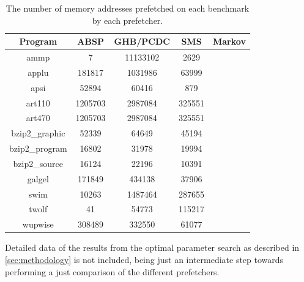 \begin{table}[htbp]
  \centering
  \begin{tabular}{|c|c|c|c|c|}
    \hline
    \textbf{Program} & \textbf{ABSP} & \textbf{GHB/PCDC} & \textbf{SMS} & \textbf{Markov} \\ \hline
    ammp             & 7             & 11133102          & 2629         &  \\ \hline
    applu            & 181817        & 1031986           & 63999        &  \\ \hline
    apsi             & 52894         & 60416             & 879          &  \\ \hline
    art110           & 1205703       & 2987084           & 325551       &  \\ \hline
    art470           & 1205703       & 2987084           & 325551       &  \\ \hline
    bzip2\_graphic   & 52339         & 64649             & 45194        &  \\ \hline
    bzip2\_program   & 16802         & 31978             & 19994        &  \\ \hline
    bzip2\_source    & 16124         & 22196             & 10391        &  \\ \hline
    galgel           & 171849        & 434138            & 37906        &  \\ \hline
    swim             & 10263         & 1487464           & 287655       &  \\ \hline
    twolf            & 41            & 54773             & 115217       &  \\ \hline
    wupwise          & 308489        & 332550            & 61077        &  \\ \hline
  \end{tabular}
  \caption{The number of memory addresses prefetched on each benchmark by each prefetcher.}
  \label{tab:numPrefetches}
\end{table}


Detailed data of the results from the optimal parameter search as
described in \autoref{sec:methodology} is not included, being just an
intermediate step towards performing a just comparison of the
different prefetchers.

